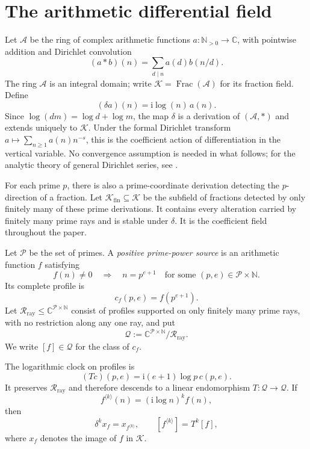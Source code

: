 \documentclass[11pt]{article}
\theoremstyle{definition}
\theoremstyle{remark}
\newcommand{\C}{\mathbb C}
\newcommand{\N}{\mathbb N}
\newcommand{\Pp}{\mathcal P}
\newcommand{\A}{\mathcal A}
\newcommand{\K}{\mathcal K}
\newcommand{\Kfin}{\mathcal K_{\mathrm{fin}}}
\newcommand{\Q}{\mathcal Q}
\newcommand{\Rloc}{\mathcal R_{\mathrm{ray}}}
\begin{document}
\section{The arithmetic differential field}\label{sec:arithmetic}

Let $\A$ be the ring of complex arithmetic functions $a:\N_{>0}\to\C$, with pointwise addition
and Dirichlet convolution
\[
  (a*b)(n)=\sum_{d\mid n}a(d)b(n/d).
\tag{2.1}
\]
The ring $\A$ is an integral domain; write $\K=\operatorname{Frac}(\A)$ for its fraction field.
Define
\[
  (\delta a)(n)=\mathrm i\log(n)\,a(n).                         \tag{2.2}
\]
Since $\log(dm)=\log d+\log m$, the map $\delta$ is a derivation of $(\A,*)$ and extends uniquely
to $\K$.  Under the formal Dirichlet transform $a\mapsto\sum_{n\geq1}a(n)n^{-s}$, this is the
coefficient action of differentiation in the vertical variable.  No convergence assumption is
needed in what follows; for the analytic theory of general Dirichlet series, see
\cite{DefantSchoolmann2019}.

For each prime $p$, there is also a prime-coordinate derivation detecting the $p$-direction of a
fraction.  Let $\Kfin\subseteq\K$ be the subfield of fractions detected by only finitely many of
these prime derivations.  It contains every alteration carried by finitely many prime rays and is
stable under $\delta$.  It is the coefficient field throughout the paper.

Let $\Pp$ be the set of primes.  A \emph{positive prime-power source} is an arithmetic function
$f$ satisfying
\[
  f(n)\ne0\quad\Longrightarrow\quad n=p^{e+1}
  \quad\text{for some }(p,e)\in\Pp\times\N.                    \tag{2.3}
\]
Its complete profile is
\[
  c_f(p,e)=f(p^{e+1}).                                         \tag{2.4}
\]
Let $\Rloc\leq\C^{\Pp\times\N}$ consist of profiles supported on only finitely many prime rays,
with no restriction along any one ray, and put
\[
  \Q:=\C^{\Pp\times\N}/\Rloc.                                 \tag{2.5}
\]
We write $[f]\in\Q$ for the class of $c_f$.

The logarithmic clock on profiles is
\[
  (Tc)(p,e)=\mathrm i(e+1)\log p\,c(p,e).                      \tag{2.6}
\]
It preserves $\Rloc$ and therefore descends to a linear endomorphism $T:\Q\to\Q$.  If
\[
  f^{\langle k\rangle}(n)=(\mathrm i\log n)^k f(n),            \tag{2.7}
\]
then
\[
  \delta^k x_f=x_{f^{\langle k\rangle}},
  \qquad [f^{\langle k\rangle}]=T^k[f],                        \tag{2.8}
\]
where $x_f$ denotes the image of $f$ in $\K$.
\end{document}
